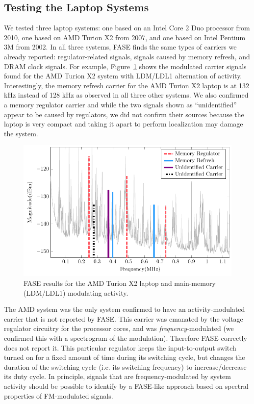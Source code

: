 \subsection{Testing the Laptop Systems}

We tested three laptop systems: one based on an Intel Core 2 Duo processor from 2010, one based on AMD Turion X2 from 2007, and one based on Intel Pentium 3M from 2002. In all three systems, FASE finds the same types of carriers we already reported: regulator-related signals, signals caused by memory refresh, and DRAM clock signals. For example, Figure~\ref{hpamd_spect_ldm} shows the modulated carrier signals found for the AMD Turion X2 system with LDM/LDL1 alternation of activity. Interestingly, the memory refresh carrier for the AMD Turion X2 laptop is at 132 kHz instead of 128 kHz as observed in all three other systems. We also confirmed a memory regulator carrier and while the two signals shown as ``unidentified'' appear to be caused by regulators, we did not confirm their sources because the laptop is very compact and taking it apart to perform localization may damage the system.

\begin{figure}[htb]
\centering
\includegraphics[trim=0.0in 0in 0in 0in,clip,width=5in]{../fase/Data/hpamd_spect_ldm.pdf}%
\caption{FASE results for the AMD Turion X2 laptop and main-memory (LDM/LDL1) modulating activity.}%
\label{hpamd_spect_ldm}
\end{figure}

The AMD system was the only system confirmed to have an activity-modulated carrier that is not reported by FASE. This carrier was emanated by the voltage regulator circuitry for the processor cores, and was \emph{frequency}-modulated (we confirmed this with a spectrogram of the modulation). Therefore FASE correctly does not report it. This particular regulator keeps the input-to-output switch turned on for a fixed amount of time during its switching cycle, but changes the duration of the switching cycle (i.e. its switching frequency) to increase/decrease its duty cycle. In principle, signals that are frequency-modulated by system activity should be possible to identify by a FASE-like approach based on spectral properties of FM-modulated signals. 

